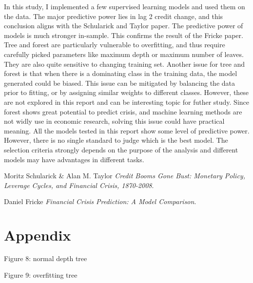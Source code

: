 \documentclass{article}
\newcommand{\ciapdf}[1]{\vspace*{-\parskip}\begin{center}\resizebox{0.75\textwidth}{!}{\texttt{[image: \#1]}}\end{center}}
\begin{document}
In this study, I implemented
a few supervised learning models and used them on the data. The major predictive
power lies in lag 2 credit change, and this conclusion aligns with the
Schularick and Taylor paper. The predictive power of models is much stronger in-sample. This confirms the result of the Fricke
paper. Tree and forest are particularly
vulnerable to overfitting, and thus require carefully picked parameters like
maximum depth or maximum number of leaves. They are also quite sensitive
to changing training set. Another issue for
tree and forest is that when there is a dominating class in the training
data, the model generated could be biased. This issue can be mitigated by
balancing the data prior to fitting, or by assigning similar weights to different
classes. However, these are not explored in this report and can be
interesting topic for futher study. Since forest shows great potential
to predict crisis, and machine learning methods are not widly use in
economic research, solving this issue could have practical meaning. All
the models tested in this report show some level of predictive power.
However, there is no single standard to judge which is the best model.
The selection criteria strongly depends on the purpose of the analysis
and different models may have advantages in different tasks.

\begin{thebibliography}{9}
Moritz Schularick \& Alan M. Taylor
\textit{Credit Booms Gone Bust: Monetary Policy, Leverage Cycles, and Financial Crisis, 1870-2008}.

Daniel Fricke
\textit{Financial Crisis Prediction: A Model Comparison}.
\end{thebibliography}

\section*{Appendix}

Figure 8: normal depth tree

\ciapdf{app_normaldepth.pdf}

Figure 9: overfitting tree
\end{document}
